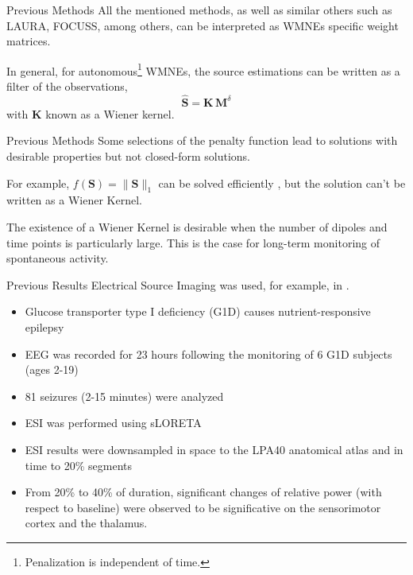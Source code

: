 \documentclass[progressbar=head]{beamer}
\newcommand{\nnorm}[1]{\lVert #1 \rVert}
\begin{document}
\begin{frame}{Previous Methods}
All the mentioned methods, as well as similar others such as LAURA\cite{LAURA},  FOCUSS\cite{focuss}, among others,
can be interpreted as WMNEs 
specific
weight matrices.

In general, for autonomous\footnote{Penalization is independent of time.} WMNEs, the source estimations can be written as a filter of the observations,
\begin{equation}
    \hat{\mathbf{S}}
    =
    \mathbf{K}\,
    \mathbf{M}^\delta
\end{equation}
with $\mathbf{K}$ known as a \alert{Wiener kernel}.

\end{frame}

\begin{frame}{Previous Methods}
Some selections of the penalty function lead to solutions with desirable properties but not closed-form solutions.

For example, $f(\mathbf{S}) = \nnorm{\mathbf{S}}_1$ can be solved efficiently \cite{review_sparse}, but the solution can't be written as a Wiener Kernel.


The existence of a Wiener Kernel is desirable when the number of dipoles and time points is particularly large. This is the case for long-term monitoring of spontaneous activity.
\end{frame}

\begin{frame}{Previous Results}
Electrical Source Imaging was used, for example, 
in
\cite{dr_pascal}.

\begin{itemize}
\item Glucose transporter type I deficiency (G1D) causes nutrient-responsive epilepsy
\item EEG was recorded for 23 hours following the monitoring
of 6 G1D subjects (ages 2-19)
\item 81 seizures (2-15 minutes) were analyzed
\item ESI was performed using sLORETA
\item ESI results were downsampled in space to the LPA40 anatomical atlas and in time to 20\% segments
\item From 20\% to 40\% of duration, significant changes of relative power (with respect to baseline) were observed to be significative on
the sensorimotor cortex and the thalamus.
\end{itemize}
\end{frame}
\end{document}
